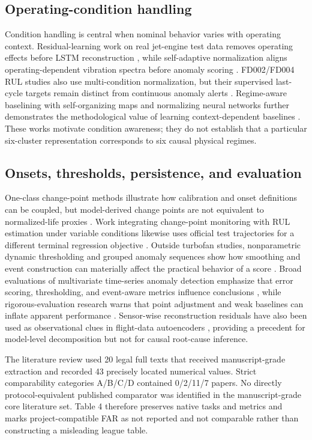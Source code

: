 \documentclass[11pt]{article}
\begin{document}
\subsection{Operating-condition handling}


Condition handling is central when nominal behavior varies with operating context. Residual-learning work on real jet-engine test data removes operating effects before LSTM reconstruction \citep{core014}, while self-adaptive normalization aligns operating-dependent vibration spectra before anomaly scoring \citep{core017}. FD002/FD004 RUL studies also use multi-condition normalization, but their supervised last-cycle targets remain distinct from continuous anomaly alerts \citep{core018}. Regime-aware baselining with self-organizing maps and normalizing neural networks further demonstrates the methodological value of learning context-dependent baselines \citep{core021}. These works motivate condition awareness; they do not establish that a particular six-cluster representation corresponds to six causal physical regimes.


\subsection{Onsets, thresholds, persistence, and evaluation}


One-class change-point methods illustrate how calibration and onset definitions can be coupled, but model-derived change points are not equivalent to normalized-life proxies \citep{core008}. Work integrating change-point monitoring with RUL estimation under variable conditions likewise uses official test trajectories for a different terminal regression objective \citep{core009}. Outside turbofan studies, nonparametric dynamic thresholding and grouped anomaly sequences show how smoothing and event construction can materially affect the practical behavior of a score \citep{core026}. Broad evaluations of multivariate time-series anomaly detection emphasize that error scoring, thresholding, and event-aware metrics influence conclusions \citep{core034}, while rigorous-evaluation research warns that point adjustment and weak baselines can inflate apparent performance \citep{core036}. Sensor-wise reconstruction residuals have also been used as observational clues in flight-data autoencoders \citep{core055}, providing a precedent for model-level decomposition but not for causal root-cause inference.


The literature review used 20 legal full texts that received manuscript-grade extraction and recorded 43 precisely located numerical values. Strict comparability categories A/B/C/D contained 0/2/11/7 papers. No directly protocol-equivalent published comparator was identified in the manuscript-grade core literature set. Table 4 therefore preserves native tasks and metrics and marks project-compatible FAR as not reported and not comparable rather than constructing a misleading league table.
\end{document}
